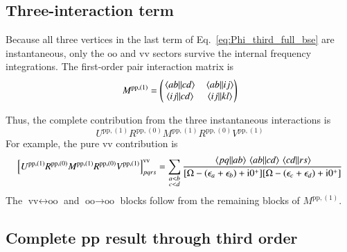 \documentclass[aip,jcp,reprint,noshowkeys,superscriptaddress]{revtex4-1}
\newcommand{\eps}{\epsilon}
\newcommand{\ii}{\mathrm{i}}
\newcommand{\pp}{\text{pp}}
\begin{document}
\subsection{Three-interaction term}

Because all three vertices in the last term of
Eq.~\eqref{eq:Phi_third_full_bse} are instantaneous, only the
$\text{oo}$ and $\text{vv}$ sectors survive the internal frequency integrations.
The first-order pair interaction matrix is
\begin{equation}
    M^{\pp,(1)}
    =
    \begin{pmatrix}
    \mel{ab}{}{cd}&\mel{ab}{}{ij}
    \\
    \mel{ij}{}{cd}&\mel{ij}{}{kl}
    \end{pmatrix}
    \label{eq:M_pp_first}
\end{equation}

Thus, the complete contribution from the three instantaneous interactions is
\begin{equation}
    U^{\pp,(1)}R^{\pp,(0)}M^{\pp,(1)}R^{\pp,(0)}V^{\pp,(1)}
    \label{eq:Phi_pp_third_three_bare}
\end{equation}
For example, the pure $\text{vv}$ contribution is
\begin{equation}
    \left[
    U^{\pp,(1)}R^{\pp,(0)}M^{\pp,(1)}R^{\pp,(0)}V^{\pp,(1)}
    \right]_{pqrs}^{\text{vv}}
    =
    \sum_{\substack{a<b\\c<d}}
    \frac{
    \mel{pq}{}{ab}\mel{ab}{}{cd}\mel{cd}{}{rs}
    }
    {[\Omega-(\eps_a+\eps_b)+\ii0^+]
     [\Omega-(\eps_c+\eps_d)+\ii0^+]}
\label{eq:Phi_pp_third_central_vv}
\end{equation}
The $\text{vv}\leftrightarrow\text{oo}$ and $\text{oo}\to\text{oo}$ blocks follow from the remaining
blocks of $M^{\pp,(1)}$.

\subsection{Complete pp result through third order}
\end{document}
